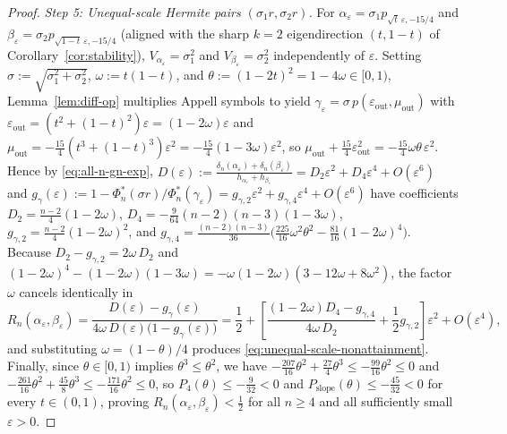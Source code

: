 \documentclass[11pt,a4paper]{article}
\theoremstyle{definition}
\begin{document}
\begin{proof}
\emph{Step 5: Unequal-scale Hermite pairs $(\sigma_1 r, \sigma_2 r)$.}
For $\alpha_\varepsilon = \sigma_1 p_{\sqrt{t}\,\varepsilon, -15/4}$ and $\beta_\varepsilon = \sigma_2 p_{\sqrt{1-t}\,\varepsilon, -15/4}$ (aligned with the sharp $k = 2$ eigendirection $(t, 1-t)$ of Corollary~\ref{cor:stability}), $V_{\alpha_\varepsilon} = \sigma_1^2$ and $V_{\beta_\varepsilon} = \sigma_2^2$ independently of $\varepsilon$. Setting $\sigma := \sqrt{\sigma_1^2+\sigma_2^2}$, $\omega := t(1-t)$, and $\theta := (1-2t)^2 = 1-4\omega \in [0,1)$, Lemma~\ref{lem:diff-op} multiplies Appell symbols to yield $\gamma_\varepsilon = \sigma\,p(\varepsilon_{\mathrm{out}}, \mu_{\mathrm{out}})$ with $\varepsilon_{\mathrm{out}} = (t^2 + (1-t)^2)\varepsilon = (1-2\omega)\varepsilon$ and $\mu_{\mathrm{out}} = -\frac{15}{4}(t^3 + (1-t)^3)\varepsilon^2 = -\frac{15}{4}(1-3\omega)\varepsilon^2$, so $\mu_{\mathrm{out}} + \frac{15}{4}\varepsilon_{\mathrm{out}}^2 = -\frac{15}{4}\omega\theta\,\varepsilon^2$. Hence by \eqref{eq:all-n-gn-exp}, $D(\varepsilon) := \frac{\delta_n(\alpha_\varepsilon)+\delta_n(\beta_\varepsilon)}{h_{\alpha_\varepsilon}+h_{\beta_\varepsilon}} = D_2\varepsilon^2 + D_4\varepsilon^4 + O(\varepsilon^6)$ and $g_\gamma(\varepsilon) := 1 - \Phi_n^*(\sigma r)/\Phi_n^*(\gamma_\varepsilon) = g_{\gamma,2}\varepsilon^2 + g_{\gamma,4}\varepsilon^4 + O(\varepsilon^6)$ have coefficients $D_2 = \frac{n-2}{4}(1-2\omega)$, $D_4 = -\frac{9}{64}(n-2)(n-3)(1-3\omega)$, $g_{\gamma,2} = \frac{n-2}{4}(1-2\omega)^2$, and $g_{\gamma,4} = \frac{(n-2)(n-3)}{36}\bigl(\frac{225}{16}\omega^2 \theta^2 - \frac{81}{16}(1-2\omega)^4\bigr)$. Because $D_2 - g_{\gamma,2} = 2\omega\,D_2$ and $(1-2\omega)^4 - (1-2\omega)(1-3\omega) = -\omega(1-2\omega)(3 - 12\omega + 8\omega^2)$, the factor $\omega$ cancels identically in
\[
R_n(\alpha_\varepsilon, \beta_\varepsilon)
= \frac{D(\varepsilon) - g_\gamma(\varepsilon)}{4\omega\,D(\varepsilon)\bigl(1 - g_\gamma(\varepsilon)\bigr)}
= \frac{1}{2} + \left[\frac{(1-2\omega)D_4 - g_{\gamma,4}}{4\omega\,D_2} + \frac{1}{2}g_{\gamma,2}\right]\varepsilon^2 + O(\varepsilon^4),
\]
and substituting $\omega = (1-\theta)/4$ produces \eqref{eq:unequal-scale-nonattainment}. Finally, since $\theta \in [0,1)$ implies $\theta^3 \le \theta^2$, we have $-\frac{207}{16}\theta^2 + \frac{27}{4}\theta^3 \le -\frac{99}{16}\theta^2 \le 0$ and $-\frac{261}{16}\theta^2 + \frac{45}{8}\theta^3 \le -\frac{171}{16}\theta^2 \le 0$, so $P_4(\theta) \le -\frac{9}{32} < 0$ and $P_{\mathrm{slope}}(\theta) \le -\frac{45}{32} < 0$ for every $t \in (0,1)$, proving $R_n(\alpha_\varepsilon, \beta_\varepsilon) < \frac{1}{2}$ for all $n \ge 4$ and all sufficiently small $\varepsilon > 0$.
\end{proof}
\end{document}
